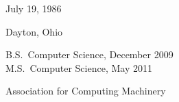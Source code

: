 %
%
%
\begin{center}
{\large\thesisauthor}
\end{center}
%
%
\newcommand{\vitalabel}[1]%
  {\raisebox{0pt}[1ex][0pt]
    {\makebox[\labelwidth][l]%
      {\parbox[t]{\labelwidth}{\hspace{0pt}\textbf{#1}}}}}
%
%
\begin{list}
  {}%
  { \renewcommand{\makelabel}{\vitalabel}%
    \setlength{\labelwidth}{100pt}%
    \setlength{\leftmargin}{120pt}%
    \setlength{\itemindent}{0pt}%
    \setlength{\parsep}{\baselineskip}%
    \setlength{\itemsep}{5pt}%
    }
\item[Date of Birth] July 19, 1986
\item[Place of Birth] Dayton, Ohio
\item[Degrees] B.S.\ Computer Science, December 2009 \\
	M.S.\ Computer Science, May 2011
\item[Professional\linebreak Societies]
  Association for Computing Machinery
%   
\end{list}
\flushright
\thesismonth\ \thesisyear

